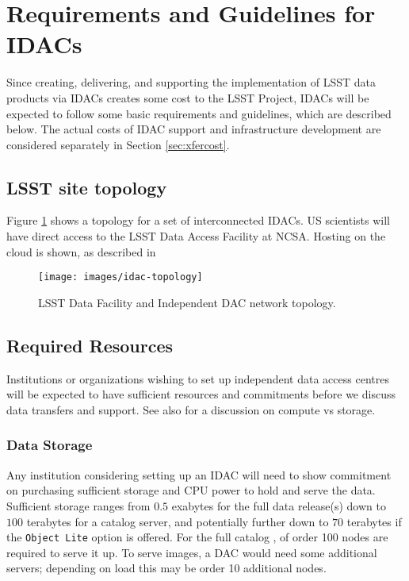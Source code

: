 \section{Requirements and Guidelines for IDACs}\label{sec:reqs}
Since creating, delivering, and supporting the implementation of LSST data products via IDACs creates some cost to the LSST Project, IDACs will be expected to follow some basic requirements and guidelines, which are described below.
The actual costs of IDAC support and infrastructure development are considered separately in Section \ref{sec:xfercost}.

\subsection{LSST site topology} \label{sec:topology}

Figure \ref{fig:idac-topology} shows a  topology for a set of interconnected IDACs.  US scientists will have direct access to the LSST Data Access Facility at NCSA.  Hosting on the cloud is shown, as described in

\begin{figure}
\begin{center}
\texttt{[image: images/idac-topology]}
\caption{LSST Data Facility and Independent DAC network topology.  \label{fig:idac-topology}}
\end{center}
\end{figure}

\subsection{Required Resources} \label{sec:resources}
Institutions or organizations wishing to set up independent data access centres will be expected to have
sufficient resources and commitments before we discuss data transfers and support.
See also  for a discussion on compute vs storage.

\subsubsection{Data Storage}
Any institution considering setting up an IDAC will need to show commitment on purchasing sufficient storage and CPU power to hold and serve the data. Sufficient storage ranges from $0.5$ exabytes for the full data release(s) down to $100$ terabytes for a catalog server, and potentially further down to $70$ terabytes if the {\tt Object Lite} option is offered. For the full catalog , of order 100 nodes are required to serve it up. To serve images, a DAC would need some additional servers; depending on load this may be order 10 additional nodes.

